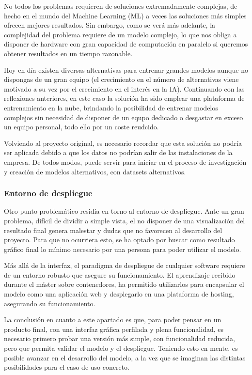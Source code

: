 No todos los problemas requieren de soluciones extremadamente complejas, de hecho en el mundo del Machine Learning (ML) a veces las soluciones más simples ofrecen mejores resultados.
Sin embargo, como se verá más adelante, la complejidad del problema requiere de un modelo complejo, lo que nos obliga a disponer de hardware con gran capacidad de computación en paralelo si queremos obtener resultados en un tiempo razonable.

Hoy en día existen diversas alternativas para entrenar grandes modelos aunque no dispongas de un gran equipo (el crecimiento en el número de alternativas viene motivado a su vez por el crecimiento en el interés en la IA).
Continuando con las reflexiones anteriores, en este caso la solución ha sido emplear una plataforma de entrenamiento en la nube, brindando la posibilidad de entrenar modelos complejos sin necesidad de disponer de un equpo dedicado o desgastar en exceso un equipo personal, todo ello por un coste reudcido.

Volviendo al proyecto original, es necesario recordar que esta solución no podría ser aplicada debido a que los datos no podrían salir de las instalaciones de la empresa.
De todos modos, puede servir para iniciar en el proceso de investigación y creación de modelos alternativos, con datasets alternativos.

\subsubsection{Entorno de despliegue}
Otro punto problemático residía en torno al entorno de despliegue.
Ante un gran problema, difícil de dividir a simple vista, el no disponer de una visualización del resultado final genera malestar y dudas que no favorecen al desarrollo del proyecto.
Para que no ocurriera esto, se ha optado por buscar como resultado gráfico final lo mínimo necesario por una persona para poder utilizar el modelo.

Más allá de la interfaz, el paradigma de despliegue de cualquier software requiere de un entorno robusto que asegure su funcionamiento.
El aprendizaje recibido durante el máster sobre contenedores, ha permitido utilizarlos para encapsular el modelo como una aplicación web y desplegarlo en una plataforma de hosting, asegurando su funcionamiento.

La conclusión en cuanto a este apartado es que, para poder pensar en un producto final, con una interfaz gráfica perfilada y plena funcionalidad, es necesario primero probar una versión más simple, con funcionalidad reducida, pero que permita validar el modelo y el despliegue.
Teniendo esto en mente, es posible avanzar en el desarrollo del modelo, a la vez que se imaginan las distintas posibilidades para el caso de uso concreto.


